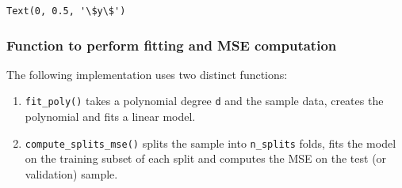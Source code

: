 \documentclass{scrartcl}
\makeatletter
\providecommand{\tightlist}{%
      \setlength{\itemsep}{0pt}\setlength{\parskip}{0pt}}
\newcommand{\boxspacing}{\kern\kvtcb@left@rule\kern\kvtcb@boxsep}
\newcommand{\prompt}[4]{
        {\ttfamily\llap{{\color{#2}[#3]:\hspace{3pt}#4}}\vspace{-\baselineskip}}
    }
\makeatother
\begin{document}
            \begin{tcolorbox}[breakable, size=fbox, boxrule=.5pt, pad at break*=1mm, opacityfill=0]
\prompt{Out}{outcolor}{91}{\boxspacing}
\begin{Verbatim}[commandchars=\\\{\}]
Text(0, 0.5, '\$y\$')
\end{Verbatim}
\end{tcolorbox}
        
    \begin{center}
    \end{center}
    
    \hypertarget{function-to-perform-fitting-and-mse-computation}{%
\subsubsection*{Function to perform fitting and MSE
computation}\label{function-to-perform-fitting-and-mse-computation}}

The following implementation uses two distinct functions:

\begin{enumerate}
\def\labelenumi{\arabic{enumi}.}
\tightlist
\item
  \texttt{fit\_poly()} takes a polynomial degree \texttt{d} and the
  sample data, creates the polynomial and fits a linear model.
\item
  \texttt{compute\_splits\_mse()} splits the sample into
  \texttt{n\_splits} folds, fits the model on the training subset of
  each split and computes the MSE on the test (or validation) sample.
\end{enumerate}
\end{document}
